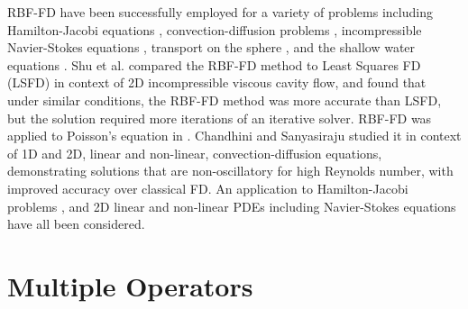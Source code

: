 \documentclass[11pt]{report}
\begin{document}
{%

RBF-FD have been successfully employed for a variety of problems including Hamilton-Jacobi equations \cite{Cecil2004}, convection-diffusion problems \cite{Chandhini2007, Stevens2009b},
incompressible Navier-Stokes equations \cite{Shu2003,Chinchapatnam2009}, transport on the sphere \cite{FornbergLehto11}, and the shallow water equations \cite{FlyerLehto11}.
Shu et al. \cite{Shu2006} compared the RBF-FD method to Least Squares FD (LSFD) in context of 2D incompressible viscous 
cavity flow, and found that under similar conditions, the RBF-FD method was more accurate than LSFD, but the solution required 
more iterations of an iterative solver. RBF-FD was applied to Poisson's 
equation in \cite{Wright2004}.  Chandhini and Sanyasiraju \cite{Chandhini2007} studied it in context of 1D and 2D, 
linear and non-linear, 
convection-diffusion equations, demonstrating solutions that are non-oscillatory for high Reynolds number, with improved 
accuracy over classical FD. An application to Hamilton-Jacobi problems \cite{Cecil2004}, and 2D linear and non-linear PDEs 
including Navier-Stokes equations \cite{Shu2003} have all been considered. 



\section{Multiple Operators}

}
\end{document}
